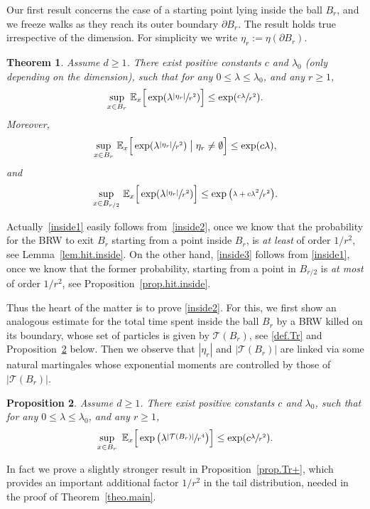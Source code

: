 \documentclass[11pt]{article}
\numberwithin{equation}{section}
\theoremstyle{plain}
\newtheorem{theorem}{Theorem}[section]
\newtheorem{proposition}[theorem]{Proposition}
\theoremstyle{definition}
\newcommand{\1}{{\text{\Large $\mathfrak 1$}}}
\begin{document}
Our first result concerns the case of a starting point
lying inside the ball $B_r$, and
we freeze walks as they reach its outer boundary $\partial B_r$. The result holds true irrespective of the dimension.
For simplicity we write $\eta_r:=\eta(\partial B_r)$.

\begin{theorem}\label{theo.inside}
Assume $d\ge 1$. There exist positive constants $c$ and $\lambda_0$ (only depending on the dimension), such that for any $0\le \lambda\le \lambda_0$, and any $r\ge 1$,
\begin{equation}\label{inside2}
\sup_{x\in B_r}\, \mathbb E_x\Big[\exp(\lambda \sfrac{|\eta_r|}{r^2})\Big]
\le \exp(\sfrac{c\lambda}{r^2}).
\end{equation}
Moreover,
\begin{equation}\label{inside1}
\sup_{x\in B_r} \, \mathbb E_x\Big[\exp(\lambda \sfrac{|\eta_r|}{r^2})\bigm| \eta_r\neq \emptyset\Big] \le \exp(c\lambda),
\end{equation}
and
\begin{equation}\label{inside3}
\sup_{x\in B_{r/2}} \, \mathbb E_x\Big[\exp(\lambda \sfrac{|\eta_r|}{r^2})
\Big] \le \exp\big(\sfrac{\lambda + c\lambda^2}{r^2}\big).
\end{equation}
\end{theorem}
Actually~\eqref{inside1} easily follows from~\eqref{inside2}, once we know that the probability for the BRW to exit $B_r$ starting from a point
inside $B_r$, is {\it at least} of order $1/r^2$, see Lemma~\ref{lem.hit.inside}. On the other hand, \eqref{inside3} follows from \eqref{inside1}, once we
know that the former probability, starting from a point in $B_{r/2}$ is
{\it at most} of order $1/r^2$, see Proposition~\ref{prop.hit.inside}.

Thus the heart of the matter is to prove \eqref{inside2}.
For this, we first show an analogous estimate for
the total time spent inside the ball $B_r$ by a BRW killed on its boundary,
whose set of particles is given by $\mathcal T(B_r)$,
see \eqref{def.Tr} and Proposition~\ref{prop.Tr} below.
Then we observe that $|\eta_r|$ and $|\mathcal T(B_r)|$
are linked via some natural martingales whose exponential moments are
controlled by those of $|\mathcal T(B_r)|$.
\begin{proposition}\label{prop.Tr}
Assume $d\ge 1$. There exist positive constants $c$ and $\lambda_0$,
such that for any $0\le \lambda\le \lambda_0$, and any $r\ge 1$,
\[
\sup_{x\in B_r}\ \mathbb E_x\Big[\exp\big(\lambda\sfrac{
|\mathbf{\mathcal T}(B_r)|}{r^4}\big)\Big]
\le\exp(c\sfrac{\lambda}{r^2}).
\]
\end{proposition}
In fact we prove a slightly stronger result
in Proposition~\ref{prop.Tr+}, which provides an important
additional factor $1/r^2$ in the tail distribution,
needed in the proof of Theorem~\ref{theo.main}.
\end{document}
